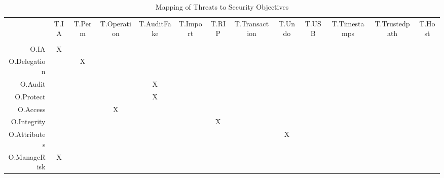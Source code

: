 \documentclass[12pt,english]{scrbook}
\begin{document}
\begin{table}
  \begin{tabular}{rcccccccccccc}
             & T.IA  & T.Perm &T.Operation&T.AuditFake&T.Import  & T.RIP&T.Transaction&T.Undo &  T.USB&T.Timestamps &  T.Trustedpath & T.Host \\
             &       &       &            &            &         &      &             &       &       &             &                 &       \\ 
O.IA         &   X   &       &            &            &         &      &             &       &       &             &                 &       \\
O.Delegation &       &    X  &            &            &         &      &             &       &       &             &                 &        \\
O.Audit      &       &       &            &     X      &         &      &             &       &       &             &                 &        \\
O.Protect    &       &       &            &     X      &         &      &             &       &       &             &                 &        \\
O.Access     &       &       &       X    &            &         &      &             &       &       &             &                 &        \\
O.Integrity  &       &       &            &            &         &    X &             &       &       &             &                 &        \\
O.Attributes &       &       &            &            &         &      &             &    X  &       &             &                 &        \\
O.ManageRisk &   X   &       &            &            &         &      &             &       &       &             &                 &        \\
  \end{tabular}
  \caption{Mapping of Threats to Security Objectives}
\end{table}

\begin{quote}
\begin{quote}

\end{quote}

\end{quote}


\end{document}
